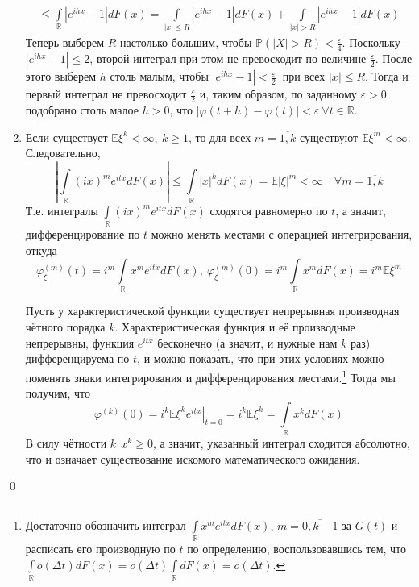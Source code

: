 \documentclass[oneside,final,14pt]{extreport}
\renewenvironment{proof}{{\bfseries Доказательство.}}{\qed}
\theoremstyle{plain}
\theoremstyle{definition}
\theoremstyle{named}
\begin{document}
\begin{proof}
\begin{enumerate}
\begin{multline*}
            \leqslant \int\limits_{\mathbb{R}} \left|e^{i h x}-1\right| d F(x)=\int\limits_{|x| \leqslant R}\left|e^{i h x}-1\right| d F(x)+\int\limits_{|x|>R}\left|e^{i h x}-1\right| d F(x)
        \end{multline*}
        Теперь выберем $R$ настолько большим, чтобы $\mathbb{P}(|X|>R) < \frac{\varepsilon}{4}$. Поскольку $\left|e^{i h x}-1\right| \leqslant 2$, второй интеграл при этом не превосходит по величине $\frac{\varepsilon}{2}$. После этого выберем $h$ столь малым, чтобы $\left|e^{i h x}-1\right|<\frac{\varepsilon}{2}~$ при всех $|x| \leqslant R$. Тогда и первый интеграл не превосходит $\frac{\varepsilon}{2}$ и, таким образом, по заданному $\varepsilon > 0$ подобрано столь малое $h >0$, что $|\varphi(t+h)-\varphi(t)|<\varepsilon~ \forall t \in \mathbb{R}$.
        \item Если существует $\mathbb{E}\xi^{k}<\infty,~ k \geqslant 1$, то для всех $m = \overline{1, k}$ существуют $\mathbb{E}\xi^{m}<\infty$. Следовательно,
        \begin{equation*}
            \left|\int\limits_{\mathbb{R}}(i x)^{m} e^{i t x} d F(x)\right| \leqslant \int\limits_{\mathbb{R}}|x|^{k} d F(x)=\mathbb{E}|\xi|^{m}<\infty \quad \forall m = \overline{1, k}
        \end{equation*}
        Т.е. интегралы $\int\limits_{\mathbb{R}}(i x)^{m} e^{i t x} d F(x)$ сходятся равномерно по $t$, а значит, дифференцирование по $t$ можно менять местами с операцией интегрирования, откуда
        \begin{equation*}
            \varphi_{\xi}^{(m)}(t)=i^{m} \int\limits_{\mathbb{R}} x^{m} e^{i t x} d F(x),~ \varphi_{\xi}^{(m)}(0)=i^{m} \int\limits_{\mathbb{R}} x^{m} d F(x)=i^{m} \mathbb{E}\xi^{m}
        \end{equation*}
        
        Пусть у характеристической функции существует непрерывная производная чётного порядка $k$. Характеристическая функция и её производные непрерывны, функция $e^{itx}$ бесконечно (а значит, и нужные нам $k$ раз) дифференцируема по $t$, и можно показать, что при этих условиях можно поменять знаки интегрирования и дифференцирования местами.\footnote{Достаточно обозначить интеграл $\int\limits_{\mathbb{R}}{x^{m} e^{itx}dF(x)}, \, m = \overline{0, k-1}$ за $G(t)$ и расписать его производную по $t$ по определению, воспользовавшись тем, что $\int\limits_{\mathbb{R}} o(\Delta t) dF(x) = o(\Delta t) \int\limits_{\mathbb{R}} dF(x) = o(\Delta t)$.}
        Тогда мы получим, что 
        $$\varphi^{(k)}(0) = i^k \left.\mathbb{E}\xi^k e^{itx}\right|_{t=0} = i^k \mathbb{E}\xi^k = 
        \int\limits_{\mathbb{R}} x^k dF(x)
        $$
        В силу чётности $k ~~ x^k \geqslant 0$, а значит, указанный интеграл сходится абсолютно, что и означает существование искомого математического ожидания.
    \end{enumerate}
\end{proof}
\end{document}
